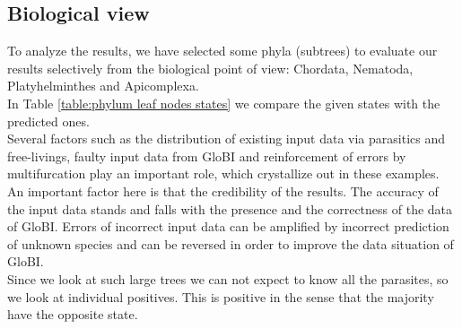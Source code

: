     \subsection{Biological view} \label{sec:biological view}
      To analyze the results, we have selected some phyla (subtrees) to evaluate our results 
        selectively from the biological point of view: Chordata, Nematoda, Platyhelminthes and 
        Apicomplexa. \\
      In Table \ref{table:phylum leaf nodes states} we compare the given states with the predicted ones. \\
      Several factors such as the distribution of existing input data via parasitics and free-livings, 
        faulty input data from GloBI and reinforcement of errors by multifurcation play an important 
        role, which crystallize out in these examples. \\
      An important factor here is that the credibility of the results. The accuracy of the input data 
        stands and falls with the presence and the correctness of the data of GloBI. Errors of incorrect 
        input data can be amplified by incorrect prediction of unknown species and can be reversed in 
        order to improve the data situation of GloBI. \\
      Since we look at such large trees we can not expect to know all the parasites, so we look at 
        individual positives. This is positive in the sense that the majority have the opposite state.

